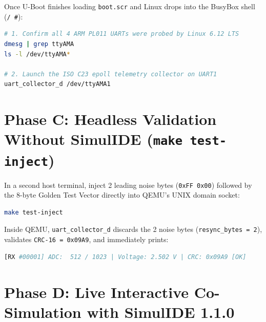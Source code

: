 \documentclass[11pt,a4paper,oneside]{report}
\begin{document}
Once U-Boot finishes loading \texttt{boot.scr} and Linux drops into the BusyBox shell (\texttt{/ \#}):

\begin{lstlisting}[language=bash]
# 1. Confirm all 4 ARM PL011 UARTs were probed by Linux 6.12 LTS
dmesg | grep ttyAMA
ls -l /dev/ttyAMA*

# 2. Launch the ISO C23 epoll telemetry collector on UART1
uart_collector_d /dev/ttyAMA1
\end{lstlisting}

\section{Phase C: Headless Validation Without SimulIDE (\texttt{make test-inject})}

In a second host terminal, inject 2 leading noise bytes (\texttt{0xFF 0x00}) followed by the 8-byte Golden Test Vector directly into QEMU's UNIX domain socket:

\begin{lstlisting}[language=bash]
make test-inject
\end{lstlisting}

Inside QEMU, \texttt{uart\_collector\_d} discards the 2 noise bytes (\texttt{resync\_bytes = 2}), validates \texttt{CRC-16 = 0x09A9}, and immediately prints:
\begin{lstlisting}[language=bash]
[RX #00001] ADC:  512 / 1023 | Voltage: 2.502 V | CRC: 0x09A9 [OK]
\end{lstlisting}

\section{Phase D: Live Interactive Co-Simulation with SimulIDE 1.1.0}
\end{document}
